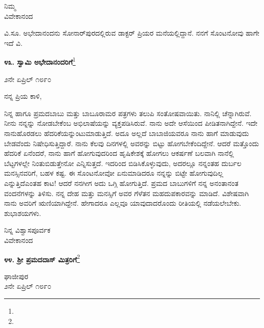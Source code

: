 \vspace{-0.5cm}

{\flushright
ನಿಮ್ಮ\\ವಿವೇಕಾನಂದ\par}

ವಿ.ಸೂ.\enginline{-} ಅಭೇದಾನಂದನು ಸೋನಾರ್‌ಪುರದಲ್ಲಿರುವ ಡಾಕ್ಟರ್ ಪ್ರಿಯರ ಮನೆಯಲ್ಲಿದ್ದಾನೆ. ನನಗೆ ಸೊಂಟನೋವು ಹಾಗೇ ಇದೆ \enginline{-} ವಿ.

\begin{center}
\textbf{೪೩. ಸ್ವಾಮಿ ಅಭೇದಾನಂದರಿಗೆ}\footnote{}
\end{center}
\vspace{-0.5cm}

\begin{flushright}
೨ನೇ ಏಪ್ರಿಲ್ ೧೮೯೦
\end{flushright}
\vspace{-0.3cm}

\noindent
ನನ್ನ ಪ್ರಿಯ ಕಾಳಿ,

ನಿನ್ನ ಹಾಗೂ ಪ್ರಮದಬಾಬು ಮತ್ತು ಬಾಬೂರಾಮರ ಪತ್ರಗಳು ತಲುಪಿ ಸಂತೋಷವಾಯಿತು. ನಾನಿಲ್ಲಿ ಚೆನ್ನಾಗಿರುವೆ. ನೀನು ನನ್ನನ್ನು ನೋಡಬೇಕೆಂಬ ಅಭಿಲಾಷೆಯನ್ನು ವ್ಯಕ್ತಪಡಿಸಿರುವೆ. ನಾನು ಅದೇ ಆಸೆಯಿಂದ ಪೀಡಿತನಾಗಿದ್ದೇನೆ. ಇದೇ ನಾನುಹೊರಡಲು ಹೆದರಿಕೆಯನ್ನುಂಟುಮಾಡುತ್ತಿದೆ. ಅದೂ ಅಲ್ಲದೆ ಬಾಬಾಜಿಯವರೂ ನಾನು ಹಾಗೆ ಮಾಡುವುದು ಬೇಡವೆಂದು ನಿಷೇಧಿಸುತ್ತಿದ್ದಾರೆ. ನಾನು ಕೆಲವು ದಿನಗಳಲ್ಲಿ ಅವರನ್ನು ಬಿಟ್ಟು ಹೋಗಬೇಕೆಂದಿದ್ದೇನೆ. ಆದರೆ ಮತ್ತೊಂದು ಹೆದರಿಕೆ ಏನೆಂದರೆ, ನಾನು ಹಾಗೆ ಹೋಗುವುದರಿಂದ ಹೃಷಿಕೇಶಕ್ಕೆ ಹೋಗಲು ಆಕರ್ಷಣೆ ಬಲವಾಗಿ ನಾನೆಲ್ಲಿ ಬೆಟ್ಟಗಳಲ್ಲೇ ನಿಂತುಬಿಡುತ್ತೇನೋ ಎನ್ನಿಸುತ್ತದೆ. ಇದರಿಂದ ಬಿಡಿಸಿಕೊಳ್ಳುವುದು, ಅದರಲ್ಲೂ ನನ್ನಂತಹ ದುರ್ಬಲ ಮನಸ್ಸಿನವರಿಗೆ, ಬಹಳ ಕಷ್ಟ. ಈ ಸೊಂಟನೋವೋ ಏನುಮಾಡಿದರೂ ನನ್ನನ್ನು ಬಿಟ್ಟೇ ಹೋಗುವುದಿಲ್ಲ ಎನ್ನುತ್ತಿದೆ\enginline{-}ಎಂತಹ ಕಾಟ! ಆದರೆ ನನಗೀಗ ಅದು ಒಗ್ಗಿ ಹೋಗುತ್ತಿದೆ. ಪ್ರಮದ ಬಾಬುಗಳಿಗೆ ನನ್ನ ಅನಂತಾನಂತ ವಂದನೆಗಳನ್ನು ತಿಳಿಸು. ನನ್ನ ದೇಹ ಮತ್ತು ಮನಸ್ಸಿಗೆ ಅವರ ಗೆಳೆತನ ಮಹದುಪಕಾರವನ್ನು ಮಾಡಿದೆ. ವಿಶೇಷವಾಗಿ ನಾನು ಅವರಿಗೆ ಋಣಿಯಾಗಿದ್ದೇನೆ. ಹೇಗಾದರೂ ಎಲ್ಲವೂ ಯಾವುದಾದರೊಂದು ರೀತಿಯಲ್ಲಿ ನಡೆಯಲೇಬೇಕು. ಶುಭಾಶಯಗಳು.

\vspace{-0.5cm}

{\flushright
ನಿನ್ನ ವಿಶ್ವಾಸಪೂರ್ವಕ\\ವಿವೇಕಾನಂದ\par}
\vspace{-0.3cm}

\begin{center}
\textbf{೪೪. ಶ‍್ರೀ ಪ್ರಮದದಾಸ್ ಮಿತ್ರರಿಗೆ}\footnote{}
\end{center}

\vspace{-0.65cm}

\begin{flushright}
ಘಾಜೀಪುರ\\೨ನೇ ಏಪ್ರಿಲ್ ೧೮೯೦
\end{flushright}
\vspace{-0.5cm}

